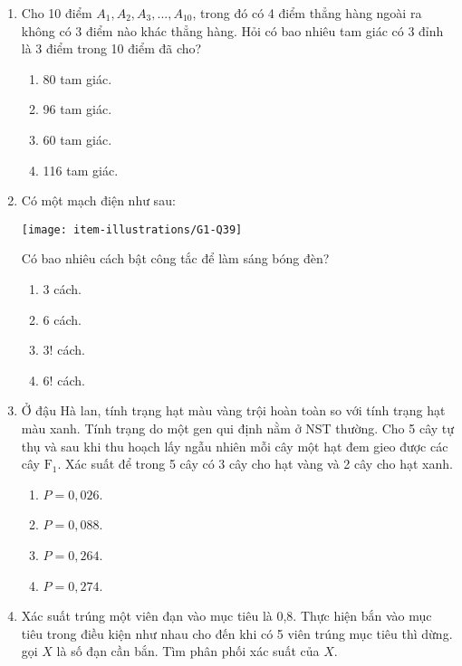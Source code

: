 \begin{enumerate}[label=\textbf{Câu \arabic*.},align=left,left=0cm..0cm,itemindent=*]
\begin{multicols}{4}
\begin{enumerate}[label=\textbf{\Alph*.},align=left,left=1cm..0cm,itemindent=*]
		\item $360$. \item $720$. \item $1080$. \item $920$.
	\end{enumerate}\end{multicols}
	\item Cho 10 điểm $A_1, A_2, A_3,..., A_{10}$, trong đó có 4 điểm thẳng hàng ngoài ra không có 3 điểm nào khác thẳng hàng. Hỏi có bao nhiêu tam giác có 3 đỉnh là 3 điểm trong 10 điểm đã cho?
	\begin{enumerate}[label=\textbf{\Alph*.},align=left,left=1cm..0cm,itemindent=*]
		\item 80 tam giác. \item 96 tam giác. \item 60 tam giác. \item 116 tam giác.
	\end{enumerate}
	\item Có một mạch điện như sau:\par
	{\centering\texttt{[image: item-illustrations/G1-Q39]}\par}
	Có bao nhiêu cách bật công tắc để làm sáng bóng đèn?
	\begin{multicols}{4}\begin{enumerate}[label=\textbf{\Alph*.},align=left,left=1cm..0cm,itemindent=*]
		\item 3 cách. \item 6 cách. \item $3!$ cách. \item $6!$ cách.
	\end{enumerate}\end{multicols}
	\item Ở đậu Hà lan, tính trạng hạt màu vàng trội hoàn toàn so với tính trạng hạt màu xanh. Tính trạng do một gen qui định nằm ở NST thường. Cho 5 cây tự thụ và sau khi thu hoạch lấy ngẫu nhiên mỗi cây một hạt đem gieo được các cây $\text{F}_1$. Xác suất để trong 5 cây có 3 cây cho hạt vàng và 2 cây cho hạt xanh.
	\begin{enumerate}[label=\textbf{\Alph*.},align=left,left=1cm..0cm,itemindent=*]
		\item $P=0,026$. \item $P=0,088$. \item $P=0,264$. \item $P=0,274$.
	\end{enumerate}
	\item Xác suất trúng một viên đạn vào mục tiêu là 0,8. Thực hiện bắn vào mục tiêu trong điều kiện như nhau cho đến khi có 5 viên trúng mục tiêu thì dừng. gọi $X$ là số đạn cần bắn. Tìm phân phối xác suất của $X$.

\end{enumerate}
